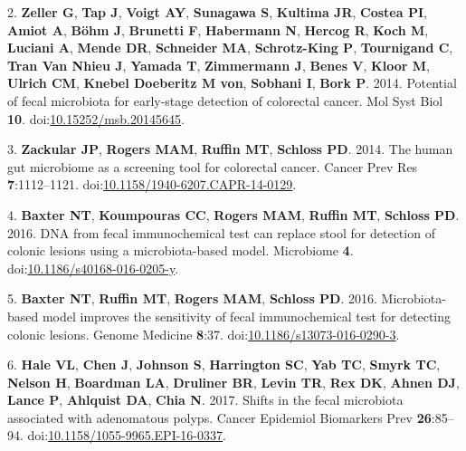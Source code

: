\documentclass[
  11pt,
]{article}
\begin{document}
\leavevmode\hypertarget{ref-zeller_potential_2014}{}%
2. \textbf{Zeller G}, \textbf{Tap J}, \textbf{Voigt AY},
\textbf{Sunagawa S}, \textbf{Kultima JR}, \textbf{Costea PI},
\textbf{Amiot A}, \textbf{Böhm J}, \textbf{Brunetti F},
\textbf{Habermann N}, \textbf{Hercog R}, \textbf{Koch M},
\textbf{Luciani A}, \textbf{Mende DR}, \textbf{Schneider MA},
\textbf{Schrotz-King P}, \textbf{Tournigand C}, \textbf{Tran Van Nhieu
J}, \textbf{Yamada T}, \textbf{Zimmermann J}, \textbf{Benes V},
\textbf{Kloor M}, \textbf{Ulrich CM}, \textbf{Knebel Doeberitz M von},
\textbf{Sobhani I}, \textbf{Bork P}. 2014. Potential of fecal microbiota
for early-stage detection of colorectal cancer. Mol Syst Biol
\textbf{10}.
doi:\href{https://doi.org/10.15252/msb.20145645}{10.15252/msb.20145645}.

\leavevmode\hypertarget{ref-zackular_human_2014}{}%
3. \textbf{Zackular JP}, \textbf{Rogers MAM}, \textbf{Ruffin MT},
\textbf{Schloss PD}. 2014. The human gut microbiome as a screening tool
for colorectal cancer. Cancer Prev Res \textbf{7}:1112--1121.
doi:\href{https://doi.org/10.1158/1940-6207.CAPR-14-0129}{10.1158/1940-6207.CAPR-14-0129}.

\leavevmode\hypertarget{ref-baxter_dna_2016}{}%
4. \textbf{Baxter NT}, \textbf{Koumpouras CC}, \textbf{Rogers MAM},
\textbf{Ruffin MT}, \textbf{Schloss PD}. 2016. DNA from fecal
immunochemical test can replace stool for detection of colonic lesions
using a microbiota-based model. Microbiome \textbf{4}.
doi:\href{https://doi.org/10.1186/s40168-016-0205-y}{10.1186/s40168-016-0205-y}.

\leavevmode\hypertarget{ref-baxter_microbiota-based_2016}{}%
5. \textbf{Baxter NT}, \textbf{Ruffin MT}, \textbf{Rogers MAM},
\textbf{Schloss PD}. 2016. Microbiota-based model improves the
sensitivity of fecal immunochemical test for detecting colonic lesions.
Genome Medicine \textbf{8}:37.
doi:\href{https://doi.org/10.1186/s13073-016-0290-3}{10.1186/s13073-016-0290-3}.

\leavevmode\hypertarget{ref-hale_shifts_2017}{}%
6. \textbf{Hale VL}, \textbf{Chen J}, \textbf{Johnson S},
\textbf{Harrington SC}, \textbf{Yab TC}, \textbf{Smyrk TC},
\textbf{Nelson H}, \textbf{Boardman LA}, \textbf{Druliner BR},
\textbf{Levin TR}, \textbf{Rex DK}, \textbf{Ahnen DJ}, \textbf{Lance P},
\textbf{Ahlquist DA}, \textbf{Chia N}. 2017. Shifts in the fecal
microbiota associated with adenomatous polyps. Cancer Epidemiol
Biomarkers Prev \textbf{26}:85--94.
doi:\href{https://doi.org/10.1158/1055-9965.EPI-16-0337}{10.1158/1055-9965.EPI-16-0337}.
\end{document}
